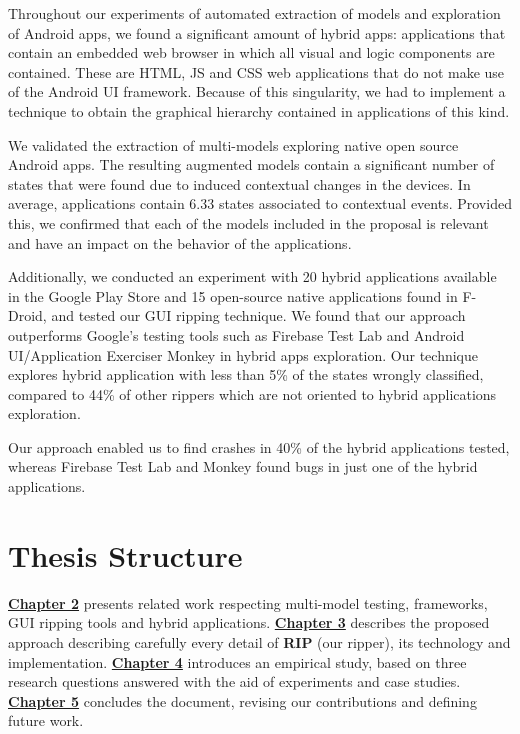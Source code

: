 Throughout our experiments of automated extraction of models and exploration of Android apps, we found a significant amount of hybrid apps: applications that contain an embedded web browser in which all visual and logic components are contained. These are HTML, JS and CSS web applications that do not make use of the Android UI framework. Because of this singularity, we had to implement a technique to obtain the graphical hierarchy contained in applications of this kind.


We validated the extraction of multi-models exploring native open source Android apps. The resulting augmented models contain a significant number of states that were found due to induced contextual changes in the devices. In average, applications contain 6.33 states associated to contextual events. Provided this, we confirmed that each of the models included in the proposal is relevant and have an impact on the behavior of the applications.

Additionally, we conducted an experiment with 20 hybrid applications available in the Google Play Store  and 15 open-source native applications found in F-Droid, and tested our GUI ripping technique. We found that our approach outperforms Google's testing tools such as Firebase Test Lab \cite{firebase} and Android UI/Application Exerciser Monkey \cite{monkey} in hybrid apps exploration. Our technique explores hybrid application with less than 5\% of the states wrongly classified, compared to 44\% of other rippers which are not oriented to hybrid applications exploration. 

Our approach enabled us to find crashes in 40\% of the hybrid applications tested, whereas Firebase Test Lab \cite{firebase} and Monkey \cite{monkey} found bugs in just one of the hybrid applications.



\section{Thesis Structure}
\label{sec:intro:structure}

 \hyperref[chapter2]{ \textbf{Chapter 2}} presents related work respecting multi-model testing, frameworks, GUI ripping tools and hybrid applications.  \hyperref[chapter3]{ \textbf{Chapter 3}} describes the proposed approach describing carefully every detail of \textbf{RIP} (our ripper), its technology and implementation. \hyperref[chapter4]{ \textbf{Chapter 4}} introduces an empirical study, based on three research questions answered with the aid of experiments and case studies.  \hyperref[chapter5]{ \textbf{Chapter 5}} concludes the document, revising our contributions and defining future work.